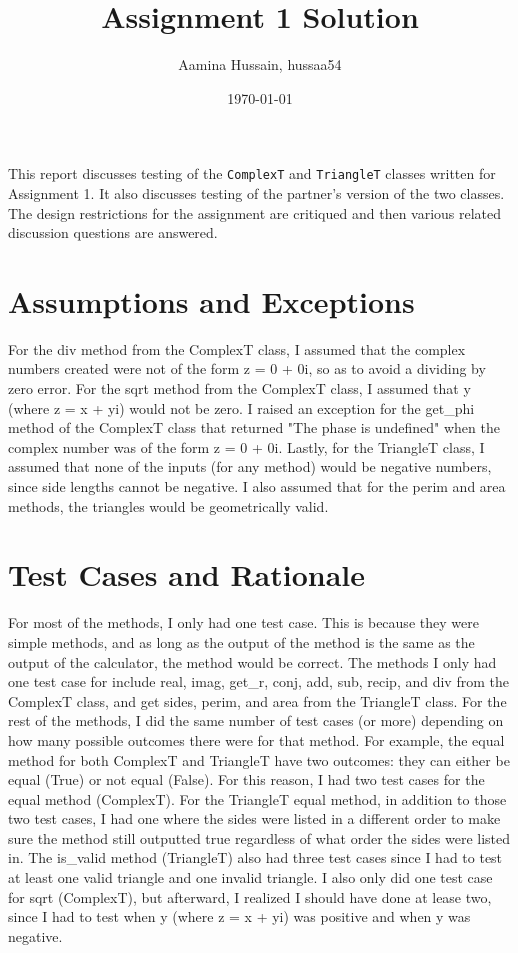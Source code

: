 \documentclass[12pt]{article}
\title{Assignment 1 Solution}
\author{Aamina Hussain, hussaa54}
\date{\today}
\begin{document}
\maketitle

This report discusses testing of the \verb|ComplexT| and \verb|TriangleT|
classes written for Assignment 1. It also discusses testing of the partner's
version of the two classes. The design restrictions for the assignment
are critiqued and then various related discussion questions are answered.

\section{Assumptions and Exceptions} \label{AssumptAndExcept}

For the div method from the ComplexT class, I assumed that the complex numbers created were not of the form z = 0 + 0i, so as to avoid a dividing by zero error. For the sqrt method from the ComplexT class, I assumed that y (where z = x + yi) would not be zero. I raised an exception for the get\_phi method of the ComplexT class that returned "The phase is undefined" when the complex number was of the form z = 0 + 0i. Lastly, for the TriangleT class, I assumed that none of the inputs (for any method) would be negative numbers, since side lengths cannot be negative. I also assumed that for the perim and area methods, the triangles would be geometrically valid.

\section{Test Cases and Rationale} \label{Testing}

For most of the methods, I only had one test case. This is because they were simple methods, and as long as the output of the method is the same as the output of the calculator, the method would be correct. The methods I only had one test case for include real, imag, get\_r, conj, add, sub, recip, and div from the ComplexT class, and get sides, perim, and area from the TriangleT class. For the rest of the methods, I did the same number of test cases (or more) depending on how many possible outcomes there were for that method. For example, the equal method for both ComplexT and TriangleT have two outcomes: they can either be equal (True) or not equal (False). For this reason, I had two test cases for the equal method (ComplexT). For the TriangleT equal method, in addition to those two test cases, I had one where the sides were listed in a different order to make sure the method still outputted true regardless of what order the sides were listed in. The is\_valid method (TriangleT) also had three test cases since I had to test at least one valid triangle and one invalid triangle. I also only did one test case for sqrt (ComplexT), but afterward, I realized I should have done at lease two, since I had to test when y (where z = x + yi) was positive and when y was negative. 
\end{document}
